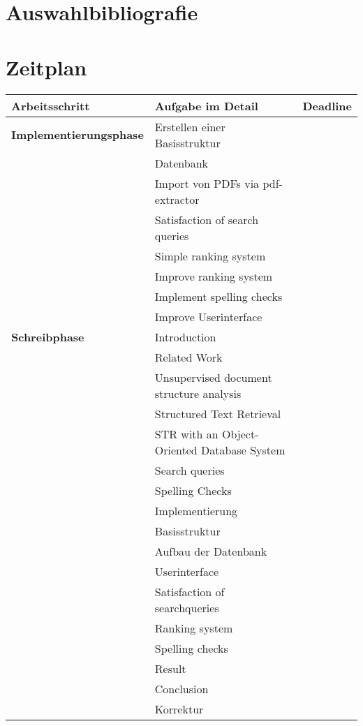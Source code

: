 \documentclass[a4paper, 12pt]{scrartcl}
\begin{document}
\section{Auswahlbibliografie}


\nocite{*}

\section{Zeitplan}


\begin{tabular}{ | l | l | c | }
  \hline
  \rowcolor{lightblue}
  \textbf{Arbeitsschritt} & \textbf{Aufgabe im Detail} & \textbf{Deadline} \\ \hline
  \textbf{Implementierungsphase} & Erstellen einer Basisstruktur & \\ \hline
    & Datenbank & \\ \hline
    & Import von PDFs via pdf-extractor & \\ \hline
    & Satisfaction of search queries & \\ \hline
    & Simple ranking system & \\ \hline
    & Improve ranking system & \\ \hline
    & Implement spelling checks & \\ \hline
    & Improve Userinterface & \\ \hline \hline
  \textbf{Schreibphase} & Introduction & \\ \hline
    & Related Work & \\ \hline
    & Unsupervised document structure analysis & \\ \hline
    & Structured Text Retrieval & \\ \hline
    & STR with an Object-Oriented Database System & \\ \hline
    & Search queries & \\ \hline
    & Spelling Checks & \\ \hline
    & Implementierung & \\ \hline
    & Basisstruktur & \\ \hline
    & Aufbau der Datenbank & \\ \hline
    & Userinterface & \\ \hline
    & Satisfaction of searchqueries & \\ \hline
    & Ranking system & \\ \hline
    & Spelling checks & \\ \hline
    & Result & \\ \hline
    & Conclusion & \\ \hline
    & Korrektur & \\ \hline
\end{tabular}
\end{document}
